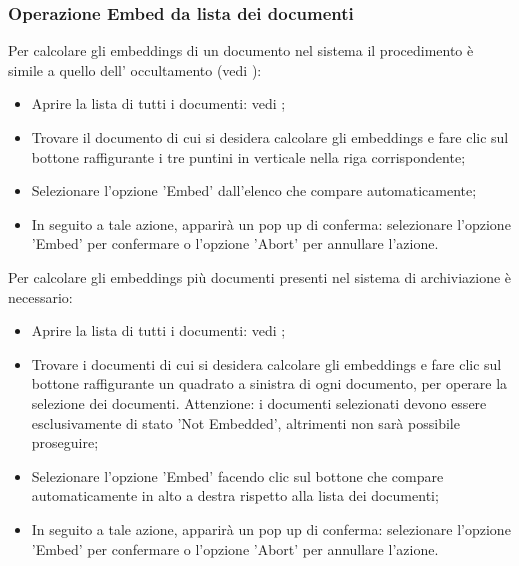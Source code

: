 \documentclass[10pt, a4paper]{article}
\begin{document}
\subsubsection{Operazione Embed da lista dei documenti}
Per calcolare gli embeddings di un documento nel sistema il procedimento è simile a quello dell' occultamento (vedi ):
\begin{itemize}
    \item Aprire la lista di tutti i documenti: vedi ;
    \item Trovare il documento di cui si desidera calcolare gli embeddings e fare clic sul bottone raffigurante i tre puntini in verticale nella riga corrispondente;
    \item Selezionare l'opzione 'Embed' dall'elenco che compare automaticamente;
    \item In seguito a tale azione, apparirà un pop up di conferma: selezionare l'opzione 'Embed' per confermare o l'opzione 'Abort' per annullare l'azione.
\end{itemize}
Per calcolare gli embeddings più documenti presenti nel sistema di archiviazione è necessario:
\begin{itemize}
    \item Aprire la lista di tutti i documenti: vedi ;
    \item Trovare i documenti di cui si desidera calcolare gli embeddings e fare clic sul bottone raffigurante un quadrato a sinistra di ogni documento, per operare la selezione dei documenti. Attenzione: i documenti selezionati devono essere esclusivamente di stato 'Not Embedded', altrimenti non sarà possibile proseguire;
    \item Selezionare l'opzione 'Embed' facendo clic sul bottone che compare automaticamente in alto a destra rispetto alla lista dei documenti;
    \item In seguito a tale azione, apparirà un pop up di conferma: selezionare l'opzione 'Embed' per confermare o l'opzione 'Abort' per annullare l'azione.
\end{itemize}
\end{document}
